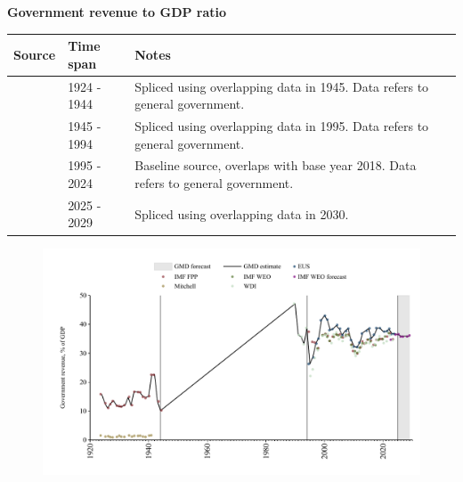 \documentclass[12pt,a4paper,landscape]{article}
\begin{document}
\begin{adjustbox}{max totalsize={\paperwidth}{\paperheight},center}
\begin{minipage}[t][\textheight][t]{\textwidth}
\vspace*{0.5cm}
{}
\begin{center}
{\Large\bfseries Government revenue to GDP ratio}
\end{center}
\vspace{0.5cm}
\begin{table}[H]
\centering
\small
\begin{tabular}{|l|l|l|}
\hline
\textbf{Source} & \textbf{Time span} & \textbf{Notes} \\
\hline
\rowcolor{white}\cite{IMF_FPP}& 1924 - 1944 &Spliced using overlapping data in 1945. Data refers to general government.\\
\rowcolor{lightgray}\cite{WDI}& 1945 - 1994 &Spliced using overlapping data in 1995. Data refers to general government.\\
\rowcolor{white}\cite{EUS}& 1995 - 2024 &Baseline source, overlaps with base year 2018. Data refers to general government.\\
\rowcolor{lightgray}\cite{IMF_WEO_forecast}& 2025 - 2029 &Spliced using overlapping data in 2030. \\
\hline
\end{tabular}
\end{table}
\begin{figure}[H]
\centering
\includegraphics[width=\textwidth,height=0.6\textheight,keepaspectratio]{graphs/BGR_govrev_GDP.pdf}
\end{figure}
\end{minipage}
\end{adjustbox}
\end{document}
